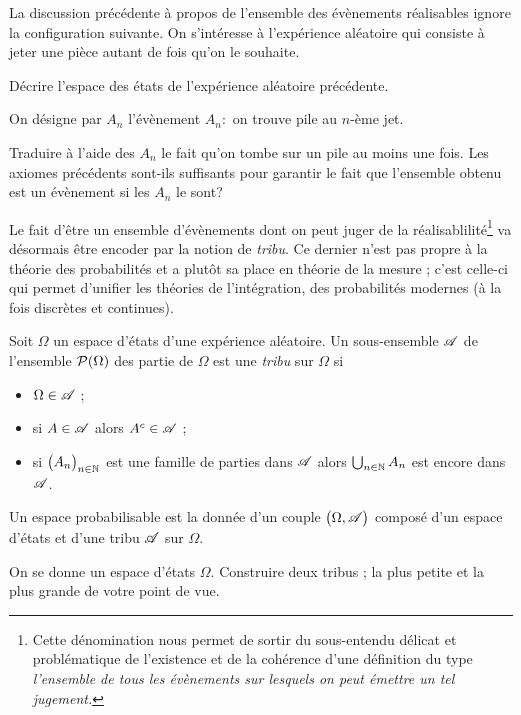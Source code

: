 \documentclass[11pt, a4paper]{article}
\begin{document}
La discussion précédente à propos de l'ensemble des évènements
réalisables ignore la configuration suivante. On s'intéresse à
l'expérience aléatoire qui consiste à jeter une pièce autant de fois
qu'on le souhaite.
\begin{question}
  Décrire l'espace des états de l'expérience aléatoire précédente.
\end{question}
On désigne par $A_n$ l'évènement $A_n:$ on trouve pile au $n$-ème jet.
\begin{question}
  Traduire à l'aide des $A_n$ le fait qu'on tombe sur un pile au moins
  une fois. Les axiomes précédents sont-ils suffisants pour garantir
  le fait que l'ensemble obtenu est un évènement si les $A_n$ le sont?
\end{question}
Le fait d'être un ensemble d'évènements dont on peut juger de la
réalisablilité\footnote{Cette dénomination nous permet de sortir du
  sous-entendu délicat et problématique de l'existence et de la
  cohérence d'une définition du type \textit{l'ensemble de tous les
    évènements sur lesquels on peut émettre un tel jugement.}} va
désormais être encoder par la notion de \emph{tribu}. Ce dernier n'est
pas propre à la théorie des probabilités et a plutôt sa place en
théorie de la mesure ; c'est celle-ci qui permet d'unifier les
théories de l'intégration, des probabilités modernes (à la fois
discrètes et continues).
\begin{defn}
  Soit $\Omega$ un espace d'états d'une expérience aléatoire. Un
  sous-ensemble $\mathscr{A}$ de l'ensemble $\mathcal{P}(\Omega)$ des partie de
  $\Omega$ est une \emph{tribu} sur $\Omega$ si
  \begin{itemize}
  \item $\Omega \in \mathscr{A}$ ;
  \item si $A \in \mathscr{A}$ alors $A^c \in \mathscr{A}$ ;
  \item si $\big(A_n\big)_{n \in \mathbb{N}}$ est une famille de parties dans
    $\mathscr{A}$ alors $\bigcup_{n \in \mathbb{N}} A_n$ est encore dans $\mathscr{A}$.
  \end{itemize}
\end{defn}
\begin{defn}
  Un espace probabilisable est la donnée d'un couple
  $\big(\Omega, \mathscr{A}\big)$ composé d'un espace d'états et d'une
  tribu $\mathscr{A}$ sur $\Omega$.
\end{defn}
\begin{question}
  On se donne un espace d'états $\Omega$. Construire deux tribus ; la
  plus petite et la plus grande de votre point de vue.
\end{question}
\end{document}
